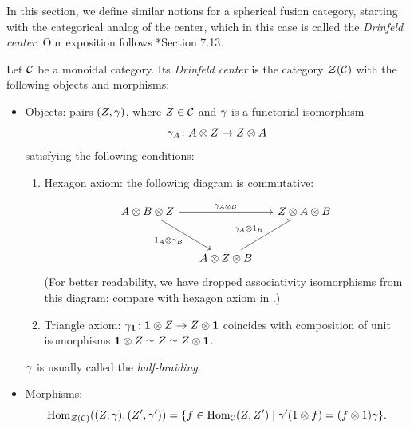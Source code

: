 In this section, we define similar notions for a spherical fusion category,
starting with the categorical analog of the center, which in this case is
called the \emph{Drinfeld center}. Our exposition
follows *{Section 7.13}.
\begin{definition}\label{d:drinfeld-center}
  Let $\mathcal{C}$ be a monoidal category. Its \emph{Drinfeld center} is the category $\mathcal{Z}(\mathcal{C})$ with the following objects and
  morphisms:
  \begin{itemize}
    \item Objects: pairs $(Z, \gamma)$, where $Z\in \mathcal{C}$ and $\gamma$ is a functorial
    isomorphism
    $$
      \gamma_A\colon A\otimes Z\to Z\otimes A
    $$
    satisfying the following conditions:
    \begin{enumerate}
      \item Hexagon axiom: the following diagram is commutative:

      \begin{equation}\label{e:hexagon-drinfeld}
        \begin{tikzcd}[column sep=5mm, row sep=large]
          A\otimes B\otimes Z
          \arrow[rr,"\ga_{A\otimes B}"]
          \arrow[dr,"1_A\otimes \ga_B"']
          && Z\otimes A\otimes B\\
          & A\otimes Z\otimes B
          \arrow[ur,"\ga_A\otimes 1_B"] &
        \end{tikzcd}
      \end{equation}
      (For better readability, we have dropped associativity isomorphisms
      from this diagram; compare with hexagon axiom in .)


      \item Triangle axiom: $\gamma_{\mathbf{1}}\colon \mathbf{1} \otimes Z\to Z\otimes \mathbf{1}$
      coincides with composition of unit isomorphisms $\mathbf{1}\otimes Z\simeq
      Z\simeq Z\otimes \mathbf{1}$.
    \end{enumerate}
    $\gamma$ is usually called the \emph{half-braiding}.
    \item Morphisms:
    $$
    \operatorname{Hom}_{\mathcal{Z}(\mathcal{C})}((Z, \gamma), (Z', \gamma'))
      =\{f \in \operatorname{Hom}_{\mathcal{C}}(Z,Z')\; | \; \gamma' (1 \otimes f) =(f\otimes 1) \gamma\}.
    $$
  \end{itemize}
\end{definition}



